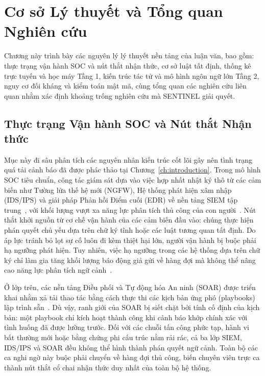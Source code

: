 \chapter{Cơ sở Lý thuyết và Tổng quan Nghiên cứu}
\label{ch:theoretical_background}

Chương này trình bày các nguyên lý lý thuyết nền tảng của luận văn, bao gồm: thực trạng vận hành SOC và nút thắt nhận thức, cơ sở luật tất định, thống kê trực tuyến và học máy Tầng 1, kiến trúc tác tử và mô hình ngôn ngữ lớn Tầng 2, nguy cơ đối kháng và kiểm toán mật mã, cùng tổng quan các nghiên cứu liên quan nhằm xác định khoảng trống nghiên cứu mà SENTINEL giải quyết.

\section{Thực trạng Vận hành SOC và Nút thắt Nhận thức}

Mục này đi sâu phân tích các nguyên nhân kiến trúc cốt lõi gây nên tình trạng quá tải cảnh báo đã được phác thảo tại Chương~\ref{ch:introduction}. Trong mô hình SOC tiêu chuẩn, công tác giám sát dựa vào việc hợp nhất nhật ký thô từ các cảm biến như Tường lửa thế hệ mới (NGFW), Hệ thống phát hiện xâm nhập (IDS/IPS) và giải pháp Phản hồi Điểm cuối (EDR) về nền tảng SIEM tập trung~\cite{siem2021}, với khối lượng vượt xa năng lực phân tích thủ công của con người~\cite{bigdata2019}. Nút thắt khởi nguồn từ cơ chế vận hành của các cảm biến đầu vào: chúng thực hiện phán quyết chủ yếu dựa trên chữ ký tĩnh hoặc các luật tương quan tất định. Do áp lực tránh bỏ lọt sự cố luôn đi kèm thiệt hại lớn, người vận hành bị buộc phải hạ ngưỡng phát hiện. Tuy nhiên, việc hạ ngưỡng trong các hệ thống dựa trên chữ ký chỉ làm gia tăng khối lượng báo động giả gửi về hàng đợi mà không thể nâng cao năng lực phân tích ngữ cảnh~\cite{alertfatigue2022, alahmadi2022}.

Ở lớp trên, các nền tảng Điều phối và Tự động hóa An ninh (SOAR) được triển khai nhằm xả tải thao tác bằng cách thực thi các kịch bản ứng phó (playbooks) lập trình sẵn~\cite{soar2025}. Dù vậy, ranh giới của SOAR bị siết chặt bởi tính cố định của kịch bản: một playbook chỉ kích hoạt thành công khi cảnh báo khớp chính xác với tình huống đã được lường trước. Đối với các chuỗi tấn công phức tạp, hành vi bất thường mới hoặc bằng chứng phi cấu trúc nằm rải rác, cả ba lớp SIEM, IDS/IPS và SOAR đều không thể hình thành phán quyết ngữ cảnh. Toàn bộ các ca nghi ngờ này buộc phải chuyển về hàng đợi thủ công, biến chuyên viên trực ca thành nút thắt cổ chai nhận thức duy nhất của toàn bộ hệ thống.

